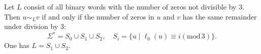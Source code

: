 \begin{exl}
Let $L$ consist of all binary words with the number of zeros not divisible by $3$.
Then $u \sim_L v$ if and only if the number of zeros in $u$ and $v$ has the same remainder under division by $3$:
\[
\Sigma^* = S_0 \cup S_1 \cup S_2, \quad S_i = \{u \mid \ell_0(u) \equiv i (\mathrm{mod}\, 3)\}.
\]
One has $L = S_1 \cup S_2$.
\end{exl}
